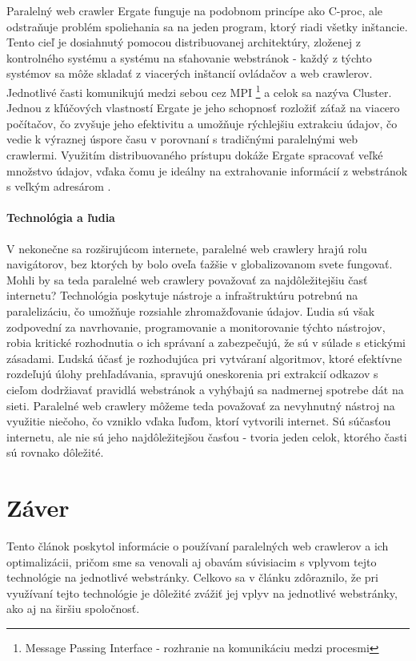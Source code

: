\documentclass[10pt,twoside,slovak,a4paper]{article}
\begin{document}
Paralelný web crawler Ergate funguje na podobnom princípe ako C-proc, ale odstraňuje problém spoliehania sa na jeden program, ktorý riadi všetky inštancie. Tento cieľ je dosiahnutý pomocou distribuovanej architektúry, zloženej z kontrolného systému a systému na sťahovanie webstránok - každý z týchto systémov sa môže skladať z viacerých inštancií ovládačov a web crawlerov. Jednotlivé časti komunikujú medzi sebou cez MPI \footnote{Message Passing Interface - rozhranie na komunikáciu medzi procesmi} a celok sa nazýva Cluster. Jednou z kľúčových vlastností Ergate je jeho schopnosť rozložiť záťaž na viacero počítačov, čo zvyšuje jeho efektivitu a umožňuje rýchlejšiu extrakciu údajov, čo vedie k výraznej úspore času v porovnaní s tradičnými paralelnými web crawlermi. Využitím distribuovaného prístupu dokáže Ergate spracovať veľké množstvo údajov, vďaka čomu je ideálny na extrahovanie informácií z webstránok s veľkým adresárom \cite{5709184}.

\paragraph{Technológia a ľudia}

V nekonečne sa rozširujúcom internete, paralelné web crawlery hrajú rolu navigátorov, bez ktorých by bolo oveľa ťažšie v globalizovanom svete fungovať. Mohli by sa teda paralelné web crawlery považovať za najdôležitejšiu časť internetu? Technológia poskytuje nástroje a infraštruktúru potrebnú na paralelizáciu, čo umožňuje rozsiahle zhromažďovanie údajov. Ľudia sú však zodpovední za navrhovanie, programovanie a monitorovanie týchto nástrojov, robia kritické rozhodnutia o ich správaní a zabezpečujú, že sú v súlade s etickými zásadami. Ľudská účasť je rozhodujúca pri vytváraní algoritmov, ktoré efektívne rozdeľujú úlohy prehľadávania, spravujú oneskorenia pri extrakcií odkazov s cieľom dodržiavať pravidlá webstránok a vyhýbajú sa nadmernej spotrebe dát na sieti. Paralelné web crawlery môžeme teda považovať za nevyhnutný nástroj na využitie niečoho, čo vzniklo vďaka ľuďom, ktorí vytvorili internet. Sú súčasťou internetu, ale nie sú jeho najdôležitejšou časťou - tvoria jeden celok, ktorého časti sú rovnako dôležité.

\section{Záver}

Tento článok poskytol informácie o používaní paralelných web crawlerov a ich optimalizácii, pričom sme sa venovali aj obavám súvisiacim s vplyvom tejto technológie na jednotlivé webstránky. Celkovo sa v článku zdôraznilo, že pri využívaní tejto technológie je dôležité zvážiť jej vplyv na jednotlivé webstránky, ako aj na širšiu spoločnosť.

\newpage



\end{document}
